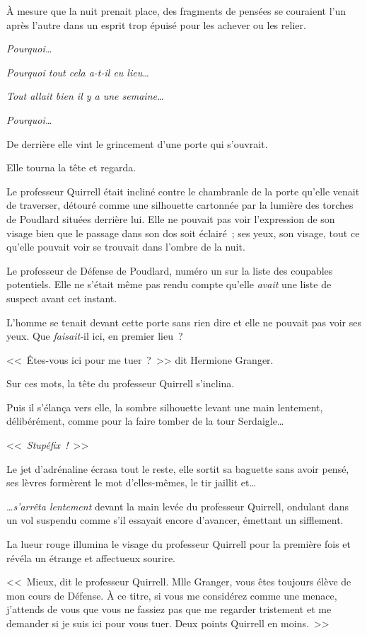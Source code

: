 À mesure que la nuit prenait place, des fragments de pensées se couraient l'un après l'autre dans un esprit trop épuisé pour les achever ou les relier.

\emph{Pourquoi…}

\emph{Pourquoi tout cela a-t-il eu lieu…}

\emph{Tout allait bien il y a une semaine…}

\emph{Pourquoi…}

De derrière elle vint le grincement d'une porte qui s'ouvrait.

Elle tourna la tête et regarda.

Le professeur Quirrell était incliné contre le chambranle de la porte qu'elle venait de traverser, détouré comme une silhouette cartonnée par la lumière des torches de Poudlard situées derrière lui. Elle ne pouvait pas voir l'expression de son visage bien que le passage dans son dos soit éclairé~; ses yeux, son visage, tout ce qu'elle pouvait voir se trouvait dans l'ombre de la nuit.

Le professeur de Défense de Poudlard, numéro un sur la liste des coupables potentiels. Elle ne s'était même pas rendu compte qu'elle \emph{avait} une liste de suspect avant cet instant.

L'homme se tenait devant cette porte sans rien dire et elle ne pouvait pas voir ses yeux. Que \emph{faisait-}il ici, en premier lieu~?

<<~Êtes-vous ici pour me tuer~?~>> dit Hermione Granger.

Sur ces mots, la tête du professeur Quirrell s'inclina.

Puis il s'élança vers elle, la sombre silhouette levant une main lentement, délibérément, comme pour la faire tomber de la tour Serdaigle…

<<~\emph{Stupéfix~!}~>>

Le jet d'adrénaline écrasa tout le reste, elle sortit sa baguette sans avoir pensé, ses lèvres formèrent le mot d'elles-mêmes, le tir jaillit et…

…\emph{s'arrêta lentement} devant la main levée du professeur Quirrell, ondulant dans un vol suspendu comme s'il essayait encore d'avancer, émettant un sifflement.

La lueur rouge illumina le visage du professeur Quirrell pour la première fois et révéla un étrange et affectueux sourire.

<<~Mieux, dit le professeur Quirrell. Mlle Granger, vous êtes toujours élève de mon cours de Défense. À ce titre, si vous me considérez comme une menace, j'attends de vous que vous ne fassiez pas que me regarder tristement et me demander si je suis ici pour vous tuer. Deux points Quirrell en moins.~>>

